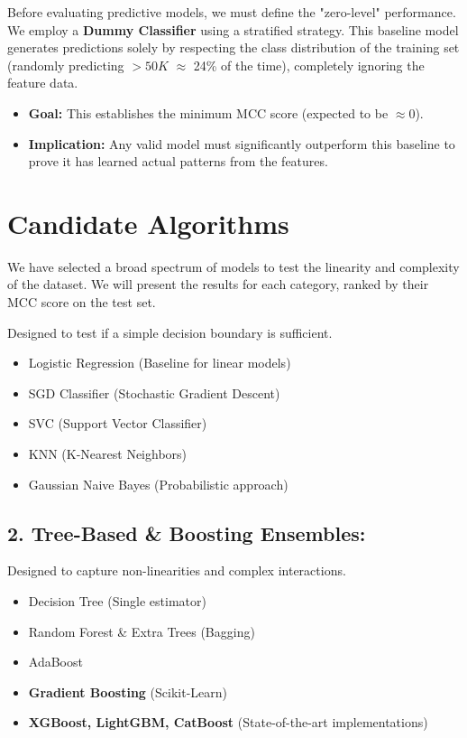 Before evaluating predictive models, we must define the "zero-level" performance. We employ a \textbf{Dummy Classifier} using a stratified strategy.
This baseline model generates predictions solely by respecting the class distribution of the training set (randomly predicting $>50K$ $\approx$ 24\%
of the time), completely ignoring the feature data.
\begin{itemize}
    \item \textbf{Goal:} This establishes the minimum MCC score (expected to be $\approx 0$).
    \item \textbf{Implication:} Any valid model must significantly outperform this baseline to prove it has learned actual patterns from the features.
\end{itemize}

\section{Candidate Algorithms}

We have selected a broad spectrum of models to test the linearity and complexity of the dataset. We will present the results for each
category, ranked by their MCC score on the test set.

Designed to test if a simple decision boundary is sufficient.
\begin{itemize}
    \item Logistic Regression (Baseline for linear models)
    \item SGD Classifier (Stochastic Gradient Descent)
    \item SVC (Support Vector Classifier)
    \item KNN (K-Nearest Neighbors)
    \item Gaussian Naive Bayes (Probabilistic approach)
\end{itemize}

\subsection{2. Tree-Based \& Boosting Ensembles:}
Designed to capture non-linearities and complex interactions.
\begin{itemize}
    \item Decision Tree (Single estimator)
    \item Random Forest \& Extra Trees (Bagging)
    \item AdaBoost
    \item \textbf{Gradient Boosting} (Scikit-Learn)
    \item \textbf{XGBoost, LightGBM, CatBoost} (State-of-the-art implementations)
\end{itemize}


